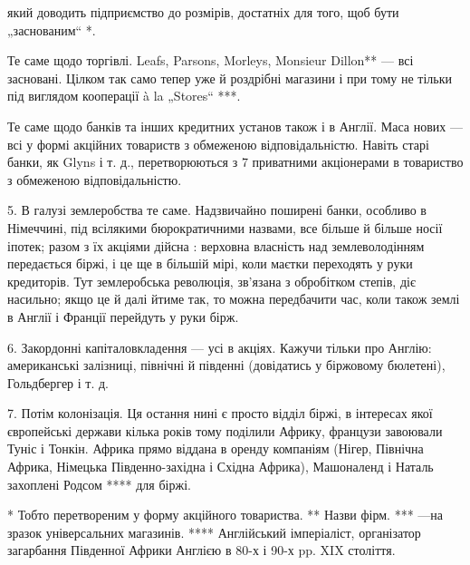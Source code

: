 \parcont{}  %
який доводить підприємство до розмірів, достатніх для того, щоб бути „заснованим“ *.

Те саме щодо торгівлі. Leafs, Parsons, Morleys, Monsieur Dillon** — всі засновані. Цілком так само тепер уже й роздрібні
магазини і при тому не тільки під виглядом кооперації à la „Stores“ ***.

Те саме щодо банків та інших кредитних установ також і в Англії. Маса нових — всі у формі акційних товариств з обмеженою
відповідальністю. Навіть старі банки, як Glyns і т. д., перетворюються з 7 приватними акціонерами в товариство з обмеженою відповідальністю.

5. В галузі землеробства те саме. Надзвичайно поширені банки, особливо в Німеччині, під всілякими
бюрократичними назвами, все більше й більше носії іпотек; разом з їх акціями дійсна :  верховна власність над
землеволодінням передається біржі, і це
ще в більшій мірі, коли маєтки переходять у руки кредиторів. Тут землеробська революція, зв’язана з обробітком степів, діє
насильно; якщо це й далі йтиме так, то можна передбачити час, коли також землі в Англії і Франції перейдуть у руки бірж.

6. Закордонні капіталовкладення — усі в акціях. Кажучи тільки про Англію: американські залізниці, північні й південні
(довідатись у біржовому бюлетені), Гольдбергер і т. д.

7. Потім колонізація. Ця остання нині є просто відділ біржі, в інтересах
якої європейські держави кілька років тому поділили Африку, французи завоювали Туніс і Тонкін. Африка прямо віддана в
оренду компаніям (Нігер, Північна Африка, Німецька Південно-західна і Східна Африка), Машоналенд і Наталь захоплені Родсом
**** для біржі.

* Тобто перетвореним у форму акційного товариства. 
** Назви фірм. 
*** —на зразок універсальних магазинів. 
**** Англійський імперіаліст, організатор загарбання Південної Африки Англією в 80-х і 90-х pp. XIX століття. 
